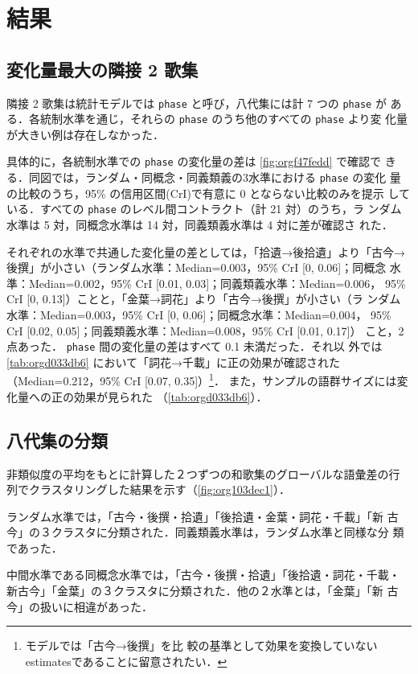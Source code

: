 \documentclass[submit]{ipsj}
\renewcommand{\ref}{\cref}
\begin{document}
\section{結果\label{orgcd2dbf6}}
\label{sec:org1e859f7}
\subsection{変化量最大の隣接 2 歌集\label{orga6326b4}}
\label{sec:orgd154596}
隣接 2 歌集は統計モデルでは \texttt{phase} と呼び，八代集には計 7 つの \texttt{phase} が
ある．各統制水準を通じ，それらの \texttt{phase} のうち他のすべての \texttt{phase} より変
化量が大きい例は存在しなかった．

具体的に，各統制水準での \texttt{phase} の変化量の差は \ref{fig:orgf47fedd} で確認で
きる．同図では，ランダム・同概念・同義類義の3水準における \texttt{phase} の変化
量の比較のうち，95\% の信用区間(CrI)で有意に 0 とならない比較のみを提示
している．すべての \texttt{phase} のレベル間コントラクト（計 21 対）のうち，ラ
ンダム水準は 5 対，同概念水準は 14 対，同義類義水準は 4 対に差が確認さ
れた．

それぞれの水準で共通した変化量の差としては，「拾遺→後拾遺」より「古今→
後撰」が小さい（ランダム水準：Median=0.003，95\% CrI [0, 0.06]；同概念
水準：Median=0.002，95\% CrI [0.01, 0.03]；同義類義水準：Median=0.006，
95\% CrI [0, 0.13]）ことと，「金葉→詞花」より「古今→後撰」が小さい（ラ
ンダム水準：Median=0.003，95\% CrI [0, 0.06]；同概念水準：Median=0.004，
95\% CrI [0.02, 0.05]；同義類義水準：Median=0.008，95\% CrI [0.01, 0.17]）
こと，2点あった． \texttt{phase} 間の変化量の差はすべて 0.1 未満だった．それ以
外では\ref{tab:orgd033db6} において「詞花→千載」に正の効果が確認された
（Median=0.212，95\% CrI [0.07, 0.35]）\footnote{モデルでは「古今→後撰」を比
較の基準として効果を変換していないestimatesであることに留意されたい．}．
また，サンプルの語群サイズには変化量への正の効果が見られた
（\ref{tab:orgd033db6}）．
\subsection{八代集の分類\label{orgb0b919f}}
\label{sec:orge8c28ee}
非類似度の平均をもとに計算した２つずつの和歌集のグローバルな語彙差の行
列でクラスタリングした結果を示す（\ref{fig:org103dec1}）．

ランダム水準では，「古今・後撰・拾遺」「後拾遺・金葉・詞花・千載」「新
古今」の３クラスタに分類された．同義類義水準は，ランダム水準と同様な分
類であった．

中間水準である同概念水準では，「古今・後撰・拾遺」「後拾遺・詞花・千載・
新古今」「金葉」の３クラスタに分類された．他の２水準とは，「金葉」「新
古今」の扱いに相違があった．
\end{document}
